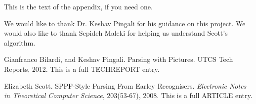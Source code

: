 \documentclass{sigplanconf}
\begin{document}
This is the text of the appendix, if you need one.

\acks
We would like to thank Dr. Keshav Pingali for his guidance on this project. We would also like to thank Sepideh Maleki for helping us understand Scott's algorithm.





\begin{thebibliography}{}
\softraggedright

Gianfranco Bilardi, and Keshav Pingali. Parsing with Pictures. UTCS Tech Reports, 2012. This is a full TECHREPORT entry.

Elizabeth Scott. SPPF-Style Parsing From Earley Recognisers. \textit{Electronic Notes in Theoretical Computer Science}, 203(53-67), 2008. This is a full ARTICLE entry.

\end{thebibliography}
\end{document}
